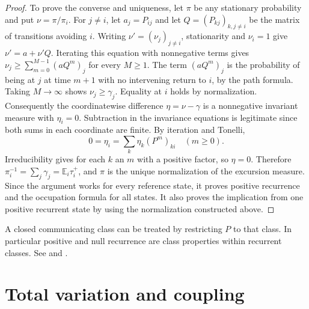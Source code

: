 \documentclass[11pt,oneside,openany]{book}
\theoremstyle{plain}
\theoremstyle{definition}
\theoremstyle{remark}
\begin{document}
\begin{proof}
To prove the converse and uniqueness, let \(\pi\) be any stationary
probability and put \(\nu=\pi/\pi_i\).
For \(j\ne i\), let \(a_j=P_{ij}\) and let \(Q=(P_{kj})_{k,j\ne i}\)
be the matrix of transitions avoiding \(i\).
Writing \(\nu'=(\nu_j)_{j\ne i}\), stationarity and \(\nu_i=1\) give
\(\nu'=a+\nu' Q\). Iterating this equation with nonnegative terms
gives \(\nu_j\ge \sum_{m=0}^{M-1}(aQ^m)_j\) for every \(M\ge1\).
The term \((aQ^m)_j\) is the probability of being at \(j\) at
time \(m+1\) with no intervening return to \(i\), by the path
formula. Taking \(M\to\infty\) shows \(\nu_j\ge\gamma_j\).
Equality at \(i\) holds by normalization. Consequently the
coordinatewise difference \(\eta=\nu-\gamma\) is a nonnegative
invariant measure with \(\eta_i=0\). Subtraction in the invariance
equations is legitimate since both sums in each coordinate are
finite. By iteration and Tonelli,
\[
 0=\eta_i=\sum_k\eta_k(P^m)_{ki}
 \quad (m\ge0).
\]
Irreducibility gives for each \(k\) an \(m\) with a positive factor,
so \(\eta=0\). Therefore \(\pi_i^{-1}=\sum_j\gamma_j
=\mathbb E_i\tau_i^+\), and \(\pi\) is the unique normalization
of the excursion measure. Since the argument works for every
reference state, it proves positive recurrence and the occupation
formula for all states. It also proves the implication from one
positive recurrent state by using the normalization constructed above.
\end{proof}

A closed communicating class can be treated by restricting \(P\)
to that class. In particular positive and null recurrence are
class properties within recurrent classes. See
\cite[Theorems 1.7.5--1.7.7]{Norris} and
\cite[Section 5.5]{Durrett}.

\section{Total variation and coupling}\label{p207:W15}
\end{document}

